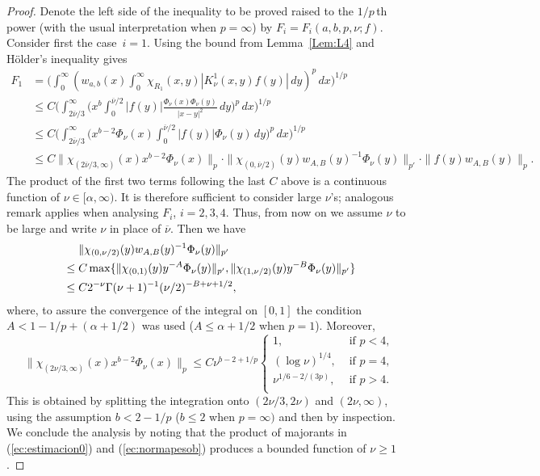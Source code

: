 \documentclass[leqno,a4paper]{amsart}
\newcommand{\overnu}{\overline{\nu}}
\begin{document}
\begin{proof}
Denote the left side of the inequality to be proved raised to the $1/p$\,th
power (with the usual interpretation when $p=\infty$) by $F_i=F_i(a,b,p,
\nu;f)$. Consider first the case~$i=1$. Using the bound
from Lemma~\ref{Lem:L4} and H\"older's inequality gives
\begin{align*}
F_1 &= \bigg(\int_{0}^{\infty} \left(w_{a,b}(x)\int_{0}^{\infty}
\chi_{R_1}(x,y) |K_{\nu}^{1}(x,y)f(y)|\,dy\right)^p\,dx\bigg)^{1/p}\\
&\le C \bigg(\int_{2\overnu/3}^{\infty}\bigg(x^b \int_{0}^{\overnu/2}
|f(y)|\frac{\Phi_{\nu}(x)
\Phi_{\nu}(y)}{|x-y|^2}\,dy\bigg)^p\,dx\bigg)^{1/p}\\
&\le C \bigg(\int_{2\overnu/3}^{\infty}\bigg(x^{b-2}
\Phi_{\nu}(x)\int_{0}^{\overnu/2} |f(y)|
\Phi_{\nu}(y)\,dy\bigg)^p\,dx\bigg)^{1/p}\\
&\le C \|\chi_{(2\overnu/3,\infty)}(x)x^{b-2}\Phi_{\nu}(x)\|_{p}
\cdot \|\chi_{(0,\overnu/2)}(y)w_{A,B}(y)^{-1}
\Phi_{\nu}(y)\|_{p'} \cdot \|f(y)w_{A,B}(y)\|_p.
\end{align*}
The product of the first two terms following the last $C$ above is a continuous function
of $\nu\in[\alpha,\infty)$. It is therefore sufficient to consider large
$\nu$'s; analogous remark applies when analysing $F_i$, $i=2,3,4$. Thus, from now on
we assume $\nu$ to be large and write $\nu$ in place of $\overnu$.
Then we have
\begin{align}
\label{ec:estimacion0}
&\phantom{\null\le\null}
\|\chi_{(0,\nu/2)}(y)w_{A,B}(y)^{-1}\Phi_\nu(y)\|_{p'}\\
&\le C\max\{\|\chi_{(0,1)}(y)y^{-A}\Phi_\nu(y)\|_{p'},
\|\chi_{(1,\nu/2)}(y)y^{-B}\Phi_\nu(y)\|_{p'}\}\nonumber\\
&\le C 2^{-\nu}\Gamma(\nu+1)^{-1}(\nu/2)^{-B+\nu+1/2}\nonumber,
\end{align}
where, to assure the convergence of the integral on $[0,1]$ the condition
$A<1-1/p+(\alpha+1/2)$ was used ($A\le\alpha+1/2$ when $p=1$). Moreover,
\begin{equation}
\label{ec:normapesob}
\|\chi_{(2\nu/3,\infty)}(x)x^{b-2}\Phi_\nu(x)\|_{p} \le C\nu^{b-2+1/p}
\begin{cases}
1, & \text{ if } p<4,\\
(\log \nu)^{1/4}, & \text{ if } p=4,\\
\nu^{1/6-2/(3p)}, & \text{ if } p>4.\\
\end{cases}
\end{equation}
This is obtained by splitting the integration onto $(2\nu/3,2\nu)$ and
$(2\nu,\infty)$, using the assumption $b<2-1/p$ ($b\le2$ when $p=\infty)$
and then by inspection.
We conclude the analysis by noting that the product of majorants in
(\ref{ec:estimacion0}) and (\ref{ec:normapesob}) produces a bounded function
of $\nu\ge1$.


\end{proof}
\end{document}
